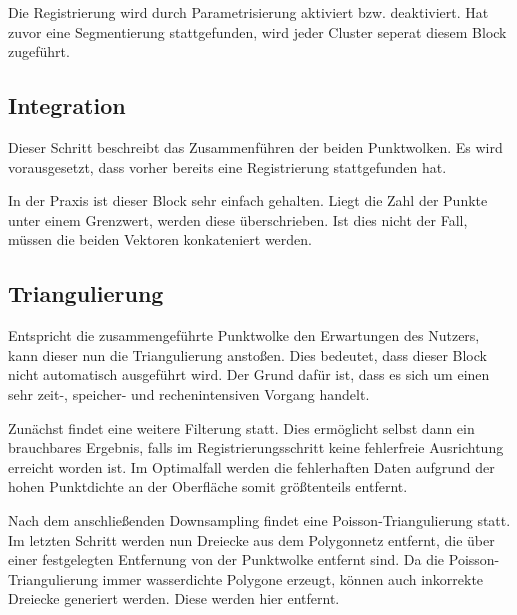 Die Registrierung wird durch Parametrisierung aktiviert bzw. deaktiviert.
Hat zuvor eine Segmentierung stattgefunden, wird jeder Cluster seperat diesem Block zugeführt.


\subsection{Integration}
\label{subsec:pipeline-integration}

Dieser Schritt beschreibt das Zusammenführen der beiden Punktwolken.
Es wird vorausgesetzt, dass vorher bereits eine Registrierung stattgefunden hat.

In der Praxis ist dieser Block sehr einfach gehalten.
Liegt die Zahl der Punkte unter einem Grenzwert, werden diese überschrieben.
Ist dies nicht der Fall, müssen die beiden Vektoren konkateniert werden.


\subsection{Triangulierung}
\label{subsec:pipeline-triangulierung}

Entspricht die zusammengeführte Punktwolke den Erwartungen des Nutzers, kann dieser nun die Triangulierung anstoßen.
Dies bedeutet, dass dieser Block nicht automatisch ausgeführt wird.
Der Grund dafür ist, dass es sich um einen sehr zeit-, speicher- und rechenintensiven Vorgang handelt.

Zunächst findet eine weitere Filterung statt.
Dies ermöglicht selbst dann ein brauchbares Ergebnis, falls im Registrierungsschritt keine fehlerfreie Ausrichtung erreicht worden ist.
Im Optimalfall werden die fehlerhaften Daten aufgrund der hohen Punktdichte an der Oberfläche somit größtenteils entfernt.

Nach dem anschließenden Downsampling findet eine Poisson-Triangulierung statt.
Im letzten Schritt werden nun Dreiecke aus dem Polygonnetz entfernt, die über einer festgelegten Entfernung von der Punktwolke entfernt sind.
Da die Poisson-Triangulierung immer wasserdichte Polygone erzeugt, können auch inkorrekte Dreiecke generiert werden.
Diese werden hier entfernt.
